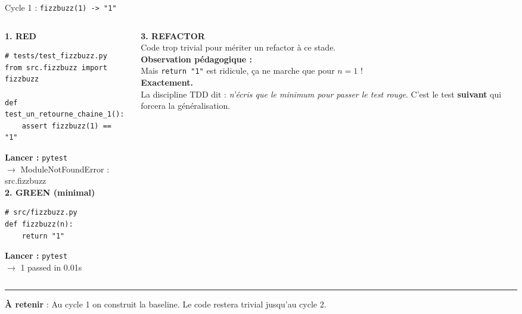\documentclass[aspectratio=169,11pt]{beamer}
\newcommand{\takeaway}[1]{%
\vfill\begin{beamercolorbox}[wd=\linewidth,sep=0.4em]{}
\color{accent2}\rule[0.6ex]{1.2em}{1.2pt}\hspace{0.4em}%
\textbf{\color{accent2}\small À retenir} \textcolor{textsoft}{:} %
{\small\color{textmain}#1}
\end{beamercolorbox}}
\begin{document}
\begin{frame}[fragile,t,shrink=12]{Cycle 1 : \texttt{fizzbuzz(1) -> "1"}}
\begin{columns}[T,onlytextwidth]
\begin{column}{0.48\textwidth}
\textbf{\color{bad}1. RED}
\begin{lstlisting}[style=pythondark]
# tests/test_fizzbuzz.py
from src.fizzbuzz import fizzbuzz

def test_un_retourne_chaine_1():
    assert fizzbuzz(1) == "1"
\end{lstlisting}
\textbf{Lancer :} \texttt{pytest} \\
{\color{bad}\scriptsize $\to$ ModuleNotFoundError : src.fizzbuzz}
\vspace{0.4em}\\
\textbf{\color{good}2. GREEN (minimal)}
\begin{lstlisting}[style=pythondark]
# src/fizzbuzz.py
def fizzbuzz(n):
    return "1"
\end{lstlisting}
\textbf{Lancer :} \texttt{pytest} \\
{\color{good}\scriptsize $\to$ 1 passed in 0.01s}
\end{column}
\begin{column}{0.48\textwidth}
\vspace{0.1cm}\footnotesize
\textbf{\color{accent}3. REFACTOR}\\[0.2em]
Code trop trivial pour mériter un refactor à ce stade.\\[0.5em]
\textbf{Observation pédagogique :}\\[0.2em]
\og Mais \texttt{return "1"} est ridicule, ça ne marche que pour $n=1$ ! \fg{}\\[0.4em]
\textbf{Exactement.}\\[0.3em]
La discipline TDD dit : \emph{n'écris que le minimum pour passer le test rouge}. C'est le test \textbf{suivant} qui forcera la généralisation.
\end{column}
\end{columns}
\takeaway{Au cycle 1 on construit la baseline. Le code restera trivial jusqu'au cycle 2.}
\end{frame}
\end{document}
